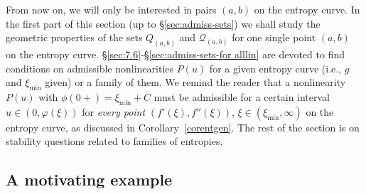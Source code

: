 \documentclass[reqno]{amsart}
\newcommand{\Q}{{\mathcal{Q}}}
\begin{document}
From now on, we will only be interested in pairs $(a,b)$ on the entropy curve. 
In the first part of this section (up to \S\ref{sec:admiss-sets}) we shall study the geometric properties of the sets $Q_{(a,b)}$ and $\Q_{(a,b)}$ for one single point $(a,b)$ on the entropy curve. 
\S\ref{sec:7.6}-\S\ref{sec:admiss-sets-for alllin} are devoted to find conditions on admissible nonlinearities $P(u)$ for a given entropy curve (i.e., $g$ and $\xi_{\min}$ given) or a family of them. We remind the reader that a nonlinearity $P(u)$ with $\phi(0+)=\xi_{\min}+\bar C$ must be admissible for a certain interval $u\in(0,\varphi(\xi))$ for \emph{every point}  $(f'(\xi),f''(\xi))$, $\xi\in(\xi_{\min},\infty)$ on the entropy curve, as discussed in Corollary~\ref{corentgen}. The rest of the section is on stability questions related to families of entropies.





\subsection{A motivating example}
\end{document}
